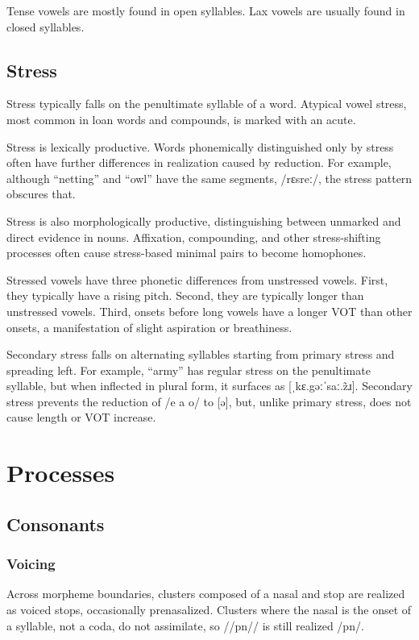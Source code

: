 Tense vowels are mostly found in open syllables. Lax vowels are usually found in closed syllables.

\section{Stress}
 Stress typically falls on the penultimate syllable of a word. Atypical vowel stress, most common in loan words and compounds, is marked with an acute. 

Stress is lexically productive. Words phonemically distinguished only by stress often have further differences in realization caused by reduction. For example, although  “netting” and  “owl” have the same segments, /rɛsreː/, the stress pattern obscures that.

Stress is also morphologically productive, distinguishing between unmarked and direct evidence in nouns. Affixation, compounding, and other stress-shifting processes often cause stress-based minimal pairs to become homophones.

Stressed vowels have three phonetic differences from unstressed vowels. First, they typically have a rising pitch. Second, they are typically longer than unstressed vowels. Third, onsets before long vowels have a longer VOT than other onsets, a manifestation of slight aspiration or breathiness.

Secondary stress falls on alternating syllables starting from primary stress and spreading left. For example,  “army” has regular stress on the penultimate syllable, but when inflected in plural form, it surfaces as  [ˌkɛ.gəːˈsaː.z̃ɹ]. Secondary stress prevents the reduction of /e a o/ to [ə], but, unlike primary stress, does not cause length or VOT increase.

\setchapterpreamble[u]{\margintoc}
\chapter{Processes}
\section{Consonants} 
\subsection{Voicing} \label{sub:voicing}
Across morpheme boundaries, clusters composed of a nasal and stop are realized as voiced stops, occasionally prenasalized.  Clusters where the nasal is the onset of a syllable, not a coda, do not assimilate, so //pn// is still realized /pn/. 

